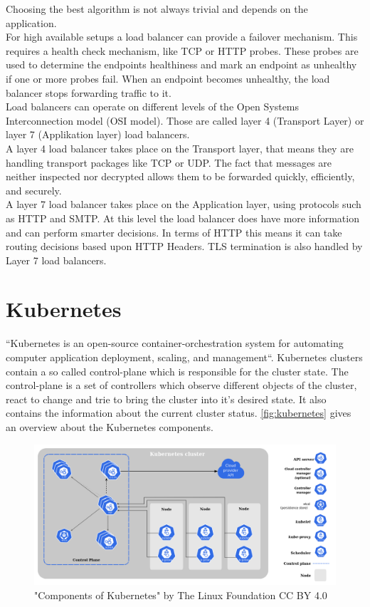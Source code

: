 Choosing the best algorithm is not always trivial and depends on the application.~\cite{ALLEN-LOAD-BALANCING}
\\
For high available setups a load balancer can provide a failover mechanism.
This requires a health check mechanism, like TCP or HTTP probes.
These probes are used to determine the endpoints healthiness and mark an endpoint as unhealthy if one or more probes fail.
When an endpoint becomes unhealthy, the load balancer stops forwarding traffic to it.
\\
Load balancers can operate on different levels of the Open Systems Interconnection model (OSI model).
Those are called layer 4 (Transport Layer) or layer 7 (Applikation layer) load balancers.
\\
A layer 4 load balancer takes place on the Transport layer, that means they are handling transport packages like TCP or UDP.
The fact that messages are neither inspected nor decrypted allows them to be forwarded quickly, efficiently, and securely.
\\
A layer 7 load balancer takes place on the Application layer, using protocols such as HTTP and SMTP.
At this level the load balancer does have more information and can perform smarter decisions.
In terms of HTTP this means it can take routing decisions based upon HTTP Headers.
TLS termination is also handled by Layer 7 load balancers.~\cite{NICHOLSON-LOAD-BALANCING}

\section{Kubernetes}
``Kubernetes is an open-source container-orchestration system for automating computer application deployment, scaling, and management``\cite{Kubernetes}.
Kubernetes clusters contain a so called control-plane which is responsible for the cluster state.
The control-plane is a set of controllers which observe different objects of the cluster, react to change and trie to bring the cluster into it's desired state.
It also contains the information about the current cluster status.
\autoref{fig:kubernetes} gives an overview about the Kubernetes components.

\begin{figure}[H]
    \centering
    \includegraphics[width=1\linewidth]{media/02/kubernetes}
    \caption{"Components of Kubernetes" by The Linux Foundation CC BY 4.0}
    \label{fig:kubernetes}
\end{figure}

